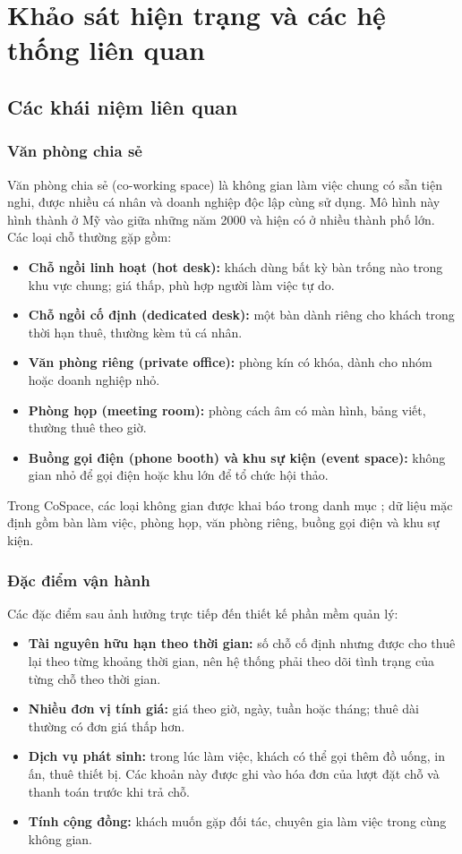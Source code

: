 \chapter{Khảo sát hiện trạng và các hệ thống liên quan}
\label{ch:khaosat}

\section{Các khái niệm liên quan}
\label{sec:khainiem}

\subsection{Văn phòng chia sẻ}
Văn phòng chia sẻ (co-working space) là không gian làm việc chung có sẵn tiện nghi, được nhiều cá nhân và doanh nghiệp độc lập cùng sử dụng. Mô hình này hình thành ở Mỹ vào giữa những năm 2000 và hiện có ở nhiều thành phố lớn. Các loại chỗ thường gặp gồm:
\begin{itemize}
    \item \textbf{Chỗ ngồi linh hoạt (hot desk):} khách dùng bất kỳ bàn trống nào trong khu vực chung; giá thấp, phù hợp người làm việc tự do.
    \item \textbf{Chỗ ngồi cố định (dedicated desk):} một bàn dành riêng cho khách trong thời hạn thuê, thường kèm tủ cá nhân.
    \item \textbf{Văn phòng riêng (private office):} phòng kín có khóa, dành cho nhóm hoặc doanh nghiệp nhỏ.
    \item \textbf{Phòng họp (meeting room):} phòng cách âm có màn hình, bảng viết, thường thuê theo giờ.
    \item \textbf{Buồng gọi điện (phone booth) và khu sự kiện (event space):} không gian nhỏ để gọi điện hoặc khu lớn để tổ chức hội thảo.
\end{itemize}
Trong CoSpace, các loại không gian được khai báo trong danh mục ; dữ liệu mặc định gồm bàn làm việc, phòng họp, văn phòng riêng, buồng gọi điện và khu sự kiện.

\subsection{Đặc điểm vận hành}
Các đặc điểm sau ảnh hưởng trực tiếp đến thiết kế phần mềm quản lý:
\begin{itemize}
    \item \textbf{Tài nguyên hữu hạn theo thời gian:} số chỗ cố định nhưng được cho thuê lại theo từng khoảng thời gian, nên hệ thống phải theo dõi tình trạng của từng chỗ theo thời gian.
    \item \textbf{Nhiều đơn vị tính giá:} giá theo giờ, ngày, tuần hoặc tháng; thuê dài thường có đơn giá thấp hơn.
    \item \textbf{Dịch vụ phát sinh:} trong lúc làm việc, khách có thể gọi thêm đồ uống, in ấn, thuê thiết bị. Các khoản này được ghi vào hóa đơn của lượt đặt chỗ và thanh toán trước khi trả chỗ.
    \item \textbf{Tính cộng đồng:} khách muốn gặp đối tác, chuyên gia làm việc trong cùng không gian.
\end{itemize}


